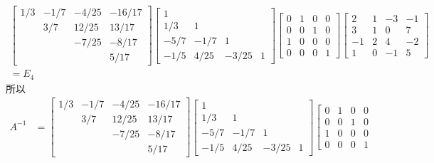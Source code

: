 \documentclass{article}
\begin{document}
\begin{itemize}
\begin{spacing}{1.5}
    $$
    \begin{array}{l}
    \left[\begin{array}{cccc}
        1/3 & -1/7 & -4/25 & -16/17 \\  & 3/7 & 12/25 & 13/17 \\  &  & -7/25 & -8/17 \\  & & & 5/17
    \end{array}\right]
    \left[\begin{array}{cccc}
        1 & & &  \\ 1/3 &    1 &  & \\ -5/7 & -1/7 &  1 &  \\ -1/5 & 4/25 & -3/25 &    1
    \end{array}\right]
    \left[\begin{array}{cccc}
        0 &    1 &    0 &    0 \\    0 &    0 &    1 &    0 \\    1 &    0 &    0 &    0 \\    0 &    0 &    0 &    1
    \end{array}\right]
    \left[\begin{array}{cccc}
        2 &    1 &   -3 &   -1 \\    3 &    1 &    0 &    7 \\   -1 &    2 &    4 &   -2 \\    1 &    0 &   -1 &    5
    \end{array}\right]\\
    = E_4
    \end{array}
    $$
    所以 $$
    \begin{array}{ll}
        A^{-1} &= \left[\begin{array}{cccc}
        1/3 & -1/7 & -4/25 & -16/17 \\  & 3/7 & 12/25 & 13/17 \\  &  & -7/25 & -8/17 \\  & & & 5/17
    \end{array}\right]
    \left[\begin{array}{cccc}
        1 & & &  \\ 1/3 &    1 &  & \\ -5/7 & -1/7 &  1 &  \\ -1/5 & 4/25 & -3/25 &    1
    \end{array}\right]
    \left[\begin{array}{cccc}
        0 &    1 &    0 &    0 \\    0 &    0 &    1 &    0 \\    1 &    0 &    0 &    0 \\    0 &    0 &    0 &    1

\end{array}
\end{array}$$
\end{spacing}
\end{itemize}
\end{document}
